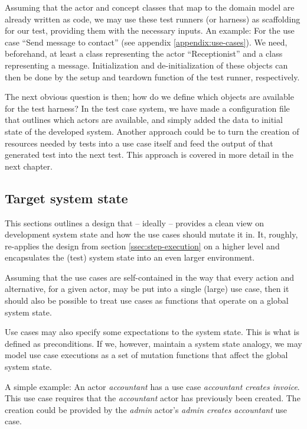 \noindent Assuming that the actor and concept classes that map to the domain model are already written as code, we may use these test runners (or harness) as scaffolding for our test, providing them with the necessary inputs. An example: For the use case ``Send message to contact'' (see appendix \ref{appendix:use-cases}). We need, beforehand, at least a class representing the actor ``Receptionist'' and a class representing a message. Initialization and de-initialization of these objects can then be done by the setup and teardown function of the test runner, respectively.\medskip

\noindent The next obvious question is then; how do we define which objects are available for the test harness? In the test case system, we have made a configuration file that outlines which actors are available, and simply added the data to initial state of the developed system. Another approach could be to turn the creation of resources needed by tests into a use case itself and feed the output of that generated test into the next test. This approach is covered in more detail in the next chapter.

\subsection{Target system state}
\label{ssec:target-system-state}
This sections outlines a design that -- ideally -- provides a clean view on development system state and how the use cases should mutate it in. It, roughly, re-applies the design from section \ref{ssec:step-execution} on a higher level and encapsulates the (test) system state into an even larger environment.\medskip

\noindent Assuming that the use cases are self-contained\cite{larman2005} in the way that every action and alternative, for a given actor, may be put into a single (large) use case, then it should also be possible to treat use cases as functions that operate on a global system state.\medskip

\noindent Use cases may also specify some expectations to the system state. This is what is defined as preconditions. If we, however, maintain a system state analogy, we may model use case executions as a set of mutation functions that affect the global system state.\medskip

\noindent A simple example: An actor \emph{accountant} has a use case \emph{accountant creates invoice}. This use case requires that the \emph{accountant} actor has previously been created. The creation could be provided by the \emph{admin} actor's \emph{admin creates accountant} use case.\medskip

